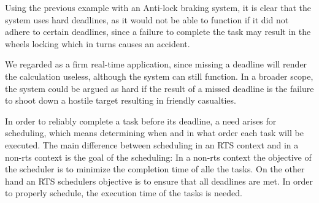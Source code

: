 Using the previous example with an Anti-lock braking system, it is clear that
the system uses hard deadlines, as it would not be able to function if it did
not adhere to certain deadlines, since a failure to complete the task may result
in the wheels locking which in turns causes an accident.

We regarded \name as a firm real-time application, since missing a deadline
will render the calculation useless, although the system can still function. In
a broader scope, the system could be argued as hard if the result of a missed
deadline is the failure to shoot down a hostile target resulting in friendly
casualties.

In order to reliably complete a task before its deadline, a need arises for
scheduling, which means determining when and in what order each task will be
executed. The main difference between scheduling in an RTS context and in a
non-rts context is the goal of the scheduling: In a non-rts context the
objective of the scheduler is to minimize the completion time of alle the tasks.
On the other hand an RTS schedulers objective is to ensure that all deadlines
are met. In order to properly schedule, the execution time of the tasks is
needed.

% 




